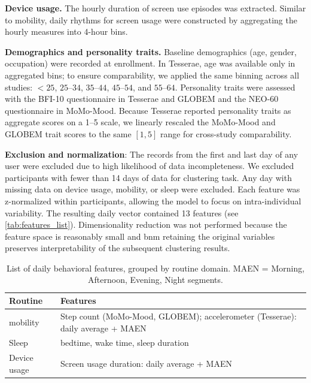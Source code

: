 \documentclass[pdflatex,sn-vancouver,Numbered]{bst/sn-jnl}%
\theoremstyle{thmstyleone}%
\theoremstyle{thmstyletwo}%
\theoremstyle{thmstylethree}%
\begin{document}
\textbf{Device usage.} The hourly duration of screen use episodes was extracted. Similar to mobility, daily rhythms for screen usage were constructed by aggregating the hourly measures into 4-hour bins. 

\textbf{Demographics and personality traits.} Baseline demographics (age, gender, occupation) were recorded at enrollment. In Tesserae, age was available only in aggregated bins; to ensure comparability, we applied the same binning across all studies: \(<\!25\), \(25\text{--}34\), \(35\text{--}44\), \(45\text{--}54\), and \(55\text{--}64\). Personality traits were assessed with the BFI-10 questionnaire \cite{rammstedt2007measuring} in Tesserae and GLOBEM and the NEO-60 questionnaire \cite{costa1992neo} in MoMo-Mood. Because Tesserae reported personality traits as aggregate scores on a 1–5 scale, we linearly rescaled the MoMo-Mood and GLOBEM trait scores to the same $[1,5]$ range for cross-study comparability.

\textbf{Exclusion and normalization}: The records from the first and last day of any user were excluded due to high likelihood of data incompleteness. We excluded participants with fewer than 14 days of data for clustering task. Any day with missing data on device usage, mobility, or sleep were excluded. Each feature was z-normalized within participants, allowing the model to focus on intra-individual variability. The resulting daily vector contained 13 features (see \autoref{tab:features_list}). Dimensionality reduction was not performed because the feature space is reasonably small and bnm  retaining the original variables preserves interpretability of the subsequent clustering results.

\begin{table}[ht]
    \centering
    \begin{tabular}{ll}
        \toprule
        \textbf{Routine} & \textbf{Features} \\
        \midrule
        mobility & Step count (MoMo-Mood, GLOBEM); accelerometer (Tesserae): daily average + MAEN \\
        Sleep             & bedtime, wake time, sleep duration \\
        Device usage      & Screen usage duration: daily average + MAEN \\
        \bottomrule
    \end{tabular}
    \caption{List of daily behavioral features, grouped by routine domain. MAEN = Morning, Afternoon, Evening, Night segments.}
    \label{tab:features_list}
\end{table}
\end{document}
